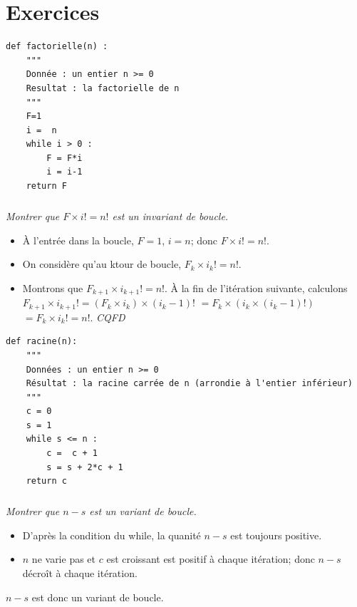 \documentclass[10pt,fleqn]{article} %
\begin{document}
\section{Exercices}
\begin{multicols}{2}
\begin{lstlisting}
def factorielle(n) :
    """
    Donnée : un entier n >= 0
    Resultat : la factorielle de n
    """
    F=1
    i =  n
    while i > 0 :
        F = F*i
        i = i-1
    return F
\end{lstlisting}
\subparagraph{}\textit{Montrer que $F \times i ! = n!$ est un invariant de boucle.}
\ifprof
\begin{corrige}
\begin{itemize}
\item À l'entrée dans la boucle, $F=1$, $i=n$;  donc $F \times i ! = n!$.
\item On considère qu'au k\ieme tour de boucle, $F_k \times i_k ! = n!$.
\item Montrons que $F_{k+1} \times i_{k+1}! =n!$. À la fin de l'itération suivante, calculons $F_{k+1} \times i_{k+1}!  = \left(F_{k} \times i_{k} \right) \times \left(i_{k} -1 \right)!  $
$= F_{k} \times \left( i_{k}  \times \left(i_{k} -1 \right)!\right)  $
$= F_{k} \times  i_{k}! = n!  $. \textit{CQFD}
\end{itemize}
\end{corrige}
\else
\fi


\begin{lstlisting}
def racine(n):
    """
    Données : un entier n >= 0
    Résultat : la racine carrée de n (arrondie à l'entier inférieur)
    """
    c = 0
    s = 1
    while s <= n :
        c =  c + 1
        s = s + 2*c + 1
    return c
\end{lstlisting}


\subparagraph{}\textit{Montrer que $n-s$ est un variant de boucle.}
\ifprof
\begin{corrige}
\begin{itemize}
\item D'après la condition du while, la quanité $n-s$ est toujours positive.
\item $n$ ne varie pas et $c$ est croissant est positif à chaque itération; donc $n-s$ décroît à chaque itération. 
\end{itemize}
$n-s$ est donc un variant de boucle.
\end{corrige}
\else
\fi

\end{multicols}
\end{document}
